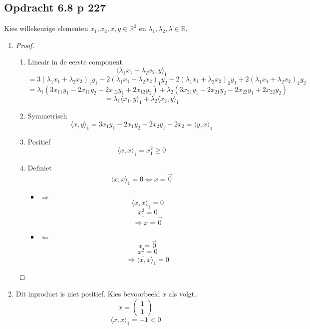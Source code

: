 \documentclass[lineaire_algebra_oplossingen.tex]{subfiles}
\begin{document}
\subsection{Opdracht 6.8 p 227}
Kies willekeurige elementen $x_1,x_2,x,y \in \mathbb{R}^{2}$ en $\lambda_1,\lambda_2,\lambda \in \mathbb{R}$.
\begin{enumerate}
\item
\begin{proof}
\begin{enumerate}
\item Lineair in de eerste component
\[
\langle \lambda_1x_1 + \lambda_2x_2,y \rangle_1
\]
\[
= 3(\lambda_1x_1 + \lambda_2x_2)_1y_1 - 2(\lambda_1x_1 + \lambda_2x_2)_1y_2-2(\lambda_1x_1 + \lambda_2x_2)_2y_1+2(\lambda_1x_1 + \lambda_2x_2)_2y_2
\]
\[
= \lambda_1(3x_{11}y_1-2x_{11}y_2-2x_{12}y_1+2x_{12}y_2) + \lambda_2(3x_{21}y_1-2x_{21}y_2-2x_{22}y_1+2x_{22}y_2)
\]
\[
= \lambda_1\langle x_1,y \rangle_1
+  \lambda_2\langle x_2,y \rangle_1
\]

\item Symmetrisch
\[
\langle x , y \rangle_1
=
3x_{1}y_1-2x_{1}y_2-2x_{2}y_1+2x_{2}
= \langle y , x \rangle_1
\]

\item Positief
\[
\langle x,x \rangle_1  = x_1^2\ge 0
\]

\item Definiet
\[
\langle x,x \rangle_1 = 0 \Leftrightarrow x= \vec{0}
\]

\begin{itemize}
\item $\Rightarrow$
\[
\langle x,x \rangle_1 = 0 
\]
\[
x_1^2=0
\]
\[
\Rightarrow x= \vec{0}
\]

\item $\Leftarrow$
\[
x= \vec{0}
\]
\[
x_1^2=0
\]
\[
 \Rightarrow \langle x,x \rangle_1 = 0
\]
\end{itemize}
\end{enumerate}
\end{proof}

\item
Dit inproduct is niet positief. 
Kies bevoorbeeld $x$ als volgt.
\[
x = 
\begin{pmatrix}
1\\1
\end{pmatrix}
\]
\[
\langle x,x \rangle_1 = -1 <0
\]
\end{enumerate}
\end{document}

